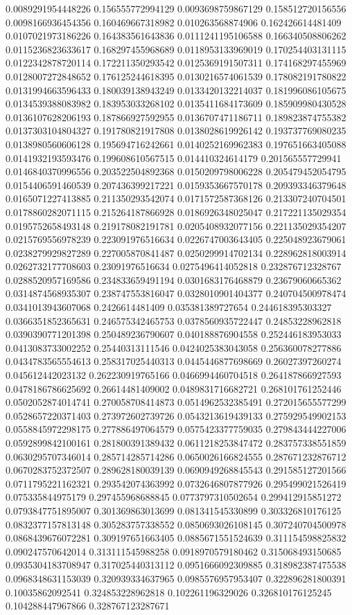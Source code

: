 \begin{table}
\begin{tabu}
\begin{sparkline}{10}
0.0089291954448226 0.156555772994129 0.0093698759867129 0.158512720156556 0.0098166936454356 0.160469667318982 0.010263568874906 0.162426614481409 0.0107021973186226 0.164383561643836 0.0111241195106588 0.166340508806262 0.0115236823633617 0.168297455968689 0.0118953133969019 0.170254403131115 0.0122342878720114 0.172211350293542 0.0125369191507311 0.174168297455969 0.0128007272848652 0.176125244618395 0.0130216574061539 0.178082191780822 0.0131994663596433 0.180039138943249 0.0133420132214037 0.181996086105675 0.0134539388083982 0.183953033268102 0.0135411684173609 0.185909980430528 0.0136107628206193 0.187866927592955 0.0136707471186711 0.189823874755382 0.0137303104804327 0.191780821917808 0.0138028619926142 0.193737769080235 0.0138980560606128 0.195694716242661 0.0140252169962383 0.197651663405088 0.0141932193593476 0.199608610567515 0.014410324614179 0.201565557729941 0.0146840370996556 0.203522504892368 0.0150209798006228 0.205479452054795 0.0154406591460539 0.207436399217221 0.0159353667570178 0.209393346379648 0.0165071227413885 0.211350293542074 0.0171572587368126 0.213307240704501 0.0178860282071115 0.215264187866928 0.0186926348025047 0.217221135029354 0.0195752658493148 0.219178082191781 0.0205408932077156 0.221135029354207 0.0215769556978239 0.223091976516634 0.0226747003643405 0.225048923679061 0.0238279929827289 0.227005870841487 0.0250299914702134 0.228962818003914 0.0262732177708603 0.23091976516634 0.0275496414052818 0.232876712328767 0.0288520957169586 0.234833659491194 0.0301683176468879 0.23679060665362 0.0314874568935307 0.238747553816047 0.0328010901404377 0.240704500978474 0.0341013943607068 0.2426614481409 0.035381389727654 0.244618395303327 0.0366351852365631 0.246575342465753 0.0378560935722447 0.24853228962818 0.0390390771201398 0.250489236790607 0.040188876904558 0.252446183953033 0.0413083733002252 0.25440313111546 0.0424025383043058 0.256360078277886 0.0434783565554613 0.258317025440313 0.0445446877698669 0.26027397260274 0.045612442023132 0.262230919765166 0.0466994460704518 0.264187866927593 0.0478186786625692 0.26614481409002 0.0489831716682721 0.268101761252446 0.0502052874014741 0.270058708414873 0.0514962532385491 0.272015655577299 0.0528657220371403 0.273972602739726 0.0543213619439133 0.275929549902153 0.0558845972298175 0.277886497064579 0.0575423377759035 0.279843444227006 0.0592899842100161 0.281800391389432 0.0611218253847472 0.283757338551859 0.0630295707346014 0.285714285714286 0.0650026166824555 0.287671232876712 0.0670283752372507 0.289628180039139 0.0690949268845543 0.291585127201566 0.0711795221162321 0.293542074363992 0.0732646807877926 0.295499021526419 0.075335844975179 0.297455968688845 0.0773797310502654 0.299412915851272 0.0793847751895007 0.301369863013699 0.081341545330899 0.303326810176125 0.0832377157813148 0.305283757338552 0.0850693026108145 0.307240704500978 0.0868439676072281 0.309197651663405 0.0885671551524639 0.311154598825832 0.090247570642014 0.313111545988258 0.0918970579180462 0.315068493150685 0.0935304183708947 0.317025440313112 0.0951666092309885 0.318982387475538 0.0968348631153039 0.320939334637965 0.0985576957953407 0.322896281800391 0.10035862092541 0.324853228962818 0.102261196329026 0.326810176125245 0.104288447967866 0.328767123287671 
\end{sparkline}
\end{tabu}
\end{table}

